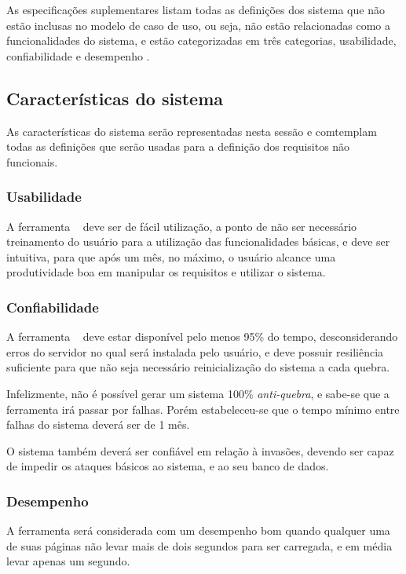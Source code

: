 As especificações suplementares listam todas as definições dos sistema que não estão inclusas no modelo de caso de uso, ou seja, não estão relacionadas como a funcionalidades do sistema, e estão categorizadas em três categorias, usabilidade, confiabilidade e desempenho \cite{rup}.

\subsection{Características do sistema}
\label{subSection:suplementares_Caract_sistema}
As características do sistema serão representadas nesta sessão e comtemplam todas as definições que serão usadas para a definição dos requisitos não funcionais.

\subsubsection{Usabilidade}
	
	A ferramenta \nomeferramenta~ deve ser de fácil utilização, a ponto de não ser necessário treinamento do usuário para a utilização das funcionalidades básicas, e deve ser intuitiva, para que após um mês, no máximo, o usuário alcance uma produtividade boa em manipular os requisitos e utilizar o sistema.

\subsubsection{Confiabilidade}

	A ferramenta \nomeferramenta~ deve estar disponível pelo menos 95\% do tempo, desconsiderando erros do servidor no qual será instalada pelo usuário, e deve possuir resiliência suficiente para que não seja necessário reinicialização do sistema a cada quebra.

	Infelizmente, não é possível gerar um sistema 100\% \textit{anti-quebra}, e sabe-se que a ferramenta irá passar por falhas. Porém estabeleceu-se que o tempo mínimo entre falhas do sistema deverá ser de 1 mês.

	O sistema também deverá ser confiável em relação à invasões, devendo ser capaz de impedir os ataques básicos ao sistema, e ao seu banco de dados.

\subsubsection{Desempenho}

	A ferramenta será considerada com um desempenho bom quando qualquer uma de suas páginas não levar mais de dois segundos para ser carregada, e em média levar apenas um segundo.

